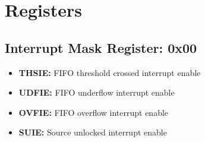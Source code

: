 \documentclass{article}
\newcommand{\bitrect}[2]{
  \begin{pgfonlayer}{foreground}
    \draw [thick] (0,0) rectangle (#1,1);
    \pgfmathsetmacro\result{#1-1}
    \foreach \x in {1,...,\result}
      \draw [thick] (\x,1) -- (\x, 0.8);
  \end{pgfonlayer}
  \bitlabels{#1}{#2}
}
\newcommand{\rwbits}[3]{
  \draw [thick] (#1,0) rectangle ++(#2,1) node[pos=0.5]{#3};
  \pgfmathsetmacro\start{#1+0.5}
  \pgfmathsetmacro\finish{#1+#2-0.5}
}
\newcommand{\robits}[3]{
  \begin{pgfonlayer}{background}
    \draw [thick, fill=lightgray] (#1,0) rectangle ++(#2,1) node[pos=0.5]{#3};
  \end{pgfonlayer}
  \pgfmathsetmacro\start{#1+0.5}
  \pgfmathsetmacro\finish{#1+#2-0.5}
}
\newcommand{\bitlabels}[2]{
  \foreach \bit in {1,...,#1}{
     \pgfmathsetmacro\result{#2}
     \node [above] at (\bit-0.5, 1) {\pgfmathprintnumber{\result}};
   }
}
\begin{document}
\section{Registers}
\subsection{Interrupt Mask Register: 0x00}
\begin{center}
\end{center}
\begin{itemize}
\item \textbf{THSIE:} FIFO threshold crossed interrupt enable
\item \textbf{UDFIE:} FIFO underflow interrupt enable 
\item \textbf{OVFIE:} FIFO overflow interrupt enable
\item \textbf{SUIE:} Source unlocked interrupt enable
\end{itemize}
\end{document}
